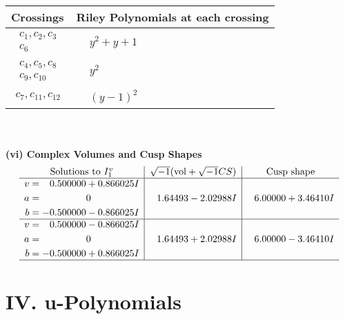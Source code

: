 \documentclass[1p]{elsarticle_modified}
\theoremstyle{definition}
\newcommand{\I}{\sqrt{-1}}
\begin{document}
\begin{tabular}{m{50pt}|m{274pt}}
Crossings & \hspace{64pt}Riley Polynomials at each crossing \\
\hline $$\begin{aligned}c_{1},c_{2},c_{3}\\c_{6}\end{aligned}$$&$\begin{aligned}
&y^2+y+1
\end{aligned}$\\
\hline $$\begin{aligned}c_{4},c_{5},c_{8}\\c_{9},c_{10}\end{aligned}$$&$\begin{aligned}
&y^2
\end{aligned}$\\
\hline $$\begin{aligned}c_{7},c_{11},c_{12}\end{aligned}$$&$\begin{aligned}
&(y-1)^2
\end{aligned}$\\
\hline
\end{tabular}\\~\\
\newpage\flushleft \textbf{(vi) Complex Volumes and Cusp Shapes}
$$\begin{array}{c|c|c}  
\text{Solutions to }I^v_{1}& \I (\text{vol} + \sqrt{-1}CS) & \text{Cusp shape}\\
 \hline 
\begin{aligned}
v &= \phantom{-}0.500000 + 0.866025 I \\
a &= \phantom{-0.000000 } 0 \\
b &= -0.500000 - 0.866025 I\end{aligned}
 & \phantom{-}1.64493 - 2.02988 I & \phantom{-}6.00000 + 3.46410 I \\ \hline\begin{aligned}
v &= \phantom{-}0.500000 - 0.866025 I \\
a &= \phantom{-0.000000 } 0 \\
b &= -0.500000 + 0.866025 I\end{aligned}
 & \phantom{-}1.64493 + 2.02988 I & \phantom{-}6.00000 - 3.46410 I\\
 \hline 
 \end{array}$$\newpage
\newpage\renewcommand{\arraystretch}{1}
\centering \section*{ IV. u-Polynomials}
\end{document}
